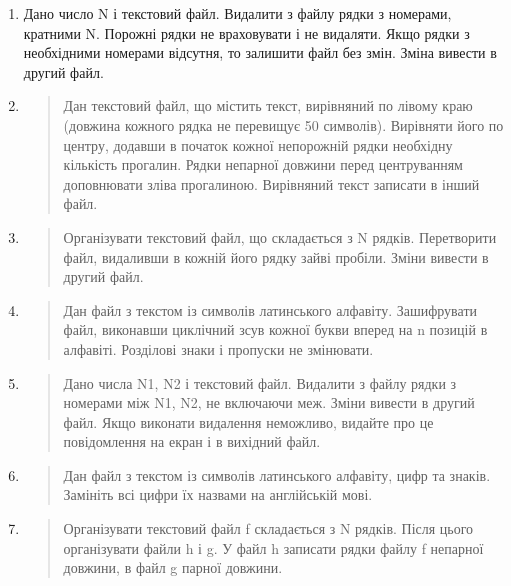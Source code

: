 \documentclass[]{article}
\begin{document}
\begin{enumerate}
\def\labelenumi{\arabic{enumi})}
\item
  Дано число N і текстовий файл. Видалити з файлу рядки з номерами,
  кратними N. Порожні рядки не враховувати і не видаляти. Якщо рядки з
  необхідними номерами відсутня, то залишити файл без змін. Зміна
  вивести в другий файл.
\item
  \begin{quote}
  Дан текстовий файл, що містить текст, вирівняний по лівому краю
  (довжина кожного рядка не перевищує 50 символів). Вирівняти його по
  центру, додавши в початок кожної непорожній рядки необхідну кількість
  прогалин. Рядки непарної довжини перед центруванням доповнювати зліва
  прогалиною. Вирівняний текст записати в інший файл.
  \end{quote}
\item
  \begin{quote}
  Організувати текстовий файл, що складається з N рядків. Перетворити
  файл, видаливши в кожній його рядку зайві пробіли. Зміни вивести в
  другий файл.
  \end{quote}
\item
  \begin{quote}
  Дан файл з текстом із символів латинського алфавіту. Зашифрувати файл,
  виконавши циклічний зсув кожної букви вперед на n позицій в алфавіті.
  Розділові знаки і пропуски не змінювати.
  \end{quote}
\item
  \begin{quote}
  Дано числа N1, N2 і текстовий файл. Видалити з файлу рядки з номерами
  між N1, N2, не включаючи меж. Зміни вивести в другий файл. Якщо
  виконати видалення неможливо, видайте про це повідомлення на екран і в
  вихідний файл.
  \end{quote}
\item
  \begin{quote}
  Дан файл з текстом із символів латинського алфавіту, цифр та знаків.
  Замініть всі цифри їх назвами на англійській мові.
  \end{quote}
\item
  \begin{quote}
  Організувати текстовий файл f складається з N рядків. Після цього
  організувати файли h і g. У файл h записати рядки файлу f непарної
  довжини, в файл g парної довжини.
  \end{quote}
\end{enumerate}
\end{document}
